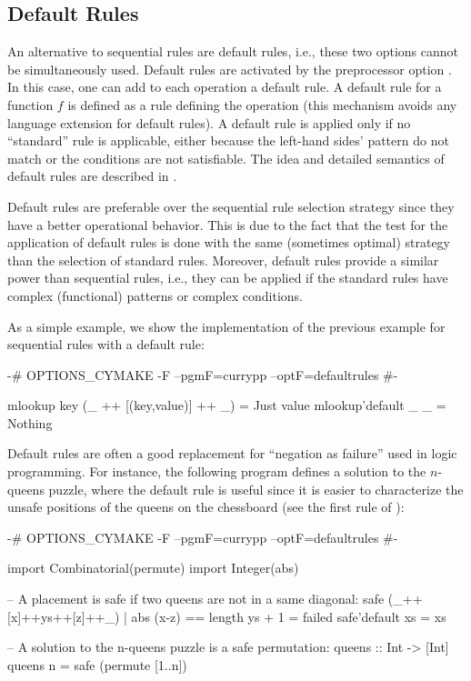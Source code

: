 \subsection{Default Rules}

An alternative to sequential rules are default rules, i.e.,
these two options cannot be simultaneously used.
Default rules are activated by the preprocessor option
.
In this case, one can add to each operation a default rule.
A default rule for a function $f$ is defined as a rule
defining the operation  (this mechanism
avoids any language extension for default rules).
A default rule is applied only if no ``standard'' rule is
applicable, either because the left-hand sides' pattern do not match
or the conditions are not satisfiable.
The idea and detailed semantics of
default rules are described in \cite{AntoyHanus16PADL}.

Default rules are preferable over the sequential rule selection
strategy since they have a better operational behavior.
This is due to the fact that the test for the application
of default rules is done with the same (sometimes optimal)
strategy than the selection of standard rules.
Moreover, default rules provide a similar power than sequential rules,
i.e., they can be applied if the standard rules have
complex (functional) patterns or complex conditions.

As a simple example, we show the implementation of the
previous example for sequential rules with a default rule:
%
\begin{curry}
{-# OPTIONS_CYMAKE -F --pgmF=currypp --optF=defaultrules #-}

mlookup key (_ ++ [(key,value)] ++ _) = Just value
mlookup'default _   _                 = Nothing 
\end{curry}
%
Default rules are often a good replacement for ``negation as failure''
used in logic programming.
For instance, the following program defines a solution
to the $n$-queens puzzle, where the default rule is useful
since it is easier to characterize the unsafe positions
of the queens on the chessboard (see the first rule of ):
%
\begin{curry}
{-# OPTIONS_CYMAKE -F --pgmF=currypp --optF=defaultrules #-}

import Combinatorial(permute)
import Integer(abs)

-- A placement is safe if two queens are not in a same diagonal:
safe (_++[x]++ys++[z]++_) | abs (x-z) == length ys + 1 = failed
safe'default xs = xs

-- A solution to the n-queens puzzle is a safe permutation:
queens :: Int -> [Int]
queens n = safe (permute [1..n])
\end{curry}


